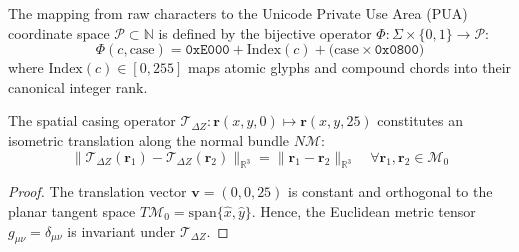 \documentclass[11pt,oneside,letterpaper]{article}
\theoremstyle{definition}
\begin{document}
\begin{definition}
The mapping from raw characters to the Unicode Private Use Area (PUA) coordinate space $\mathcal{P} \subset \mathbb{N}$ is defined by the bijective operator $\Phi: \Sigma \times \{0, 1\} \to \mathcal{P}$:
\begin{equation}
\Phi(c, \text{case}) = \mathtt{0xE000} + \mathrm{Index}(c) + \big(\text{case} \times \mathtt{0x0800}\big)
\end{equation}
where $\mathrm{Index}(c) \in [0, 255]$ maps atomic glyphs and compound chords into their canonical integer rank.
\end{definition}

\begin{proposition}
The spatial casing operator $\mathcal{T}_{\Delta Z}: \mathbf{r}(x, y, 0) \mapsto \mathbf{r}(x, y, 25)$ constitutes an isometric translation along the normal bundle $N\mathcal{M}$:
\begin{equation}
\|\mathcal{T}_{\Delta Z}(\mathbf{r}_1) - \mathcal{T}_{\Delta Z}(\mathbf{r}_2)\|_{\mathbb{R}^3} = \|\mathbf{r}_1 - \mathbf{r}_2\|_{\mathbb{R}^3} \quad \forall \mathbf{r}_1, \mathbf{r}_2 \in \mathcal{M}_0
\end{equation}
\end{proposition}
\begin{proof}
The translation vector $\mathbf{v} = (0, 0, 25)$ is constant and orthogonal to the planar tangent space $T\mathcal{M}_0 = \text{span}\{\hat{x}, \hat{y}\}$. Hence, the Euclidean metric tensor $g_{\mu\nu} = \delta_{\mu\nu}$ is invariant under $\mathcal{T}_{\Delta Z}$.
\end{proof}
\end{document}
